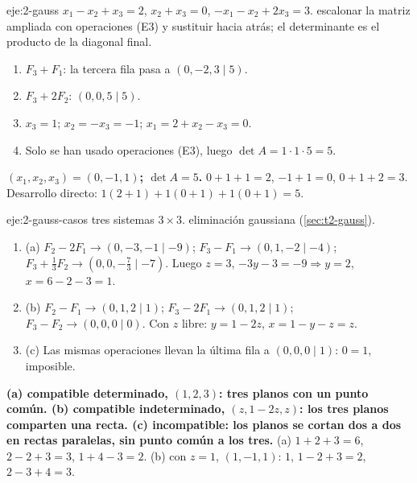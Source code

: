 \begin{solucion}{eje:2-gauss}
\datos $x_1-x_2+x_3=2$, $x_2+x_3=0$, $-x_1-x_2+2x_3=3$.
\planteamiento escalonar la matriz ampliada con operaciones (E3) y sustituir hacia atrás; el determinante es el producto de la diagonal final.
\pasos
\begin{enumerate}[label=\arabic*.]
  \item $F_3+F_1$: la tercera fila pasa a $(0,-2,3\mid5)$.
  \item $F_3+2F_2$: $(0,0,5\mid5)$.
  \item $x_3=1$; $x_2=-x_3=-1$; $x_1=2+x_2-x_3=0$.
  \item Solo se han usado operaciones (E3), luego $\det A=1\cdot1\cdot5=5$.
\end{enumerate}
\resultado \textbf{$(x_1,x_2,x_3)=(0,-1,1)$; $\det A=5$.}
\comprobacion $0+1+1=2$, $-1+1=0$, $0+1+2=3$. Desarrollo directo: $1(2+1)+1(0+1)+1(0+1)=5$.
\end{solucion}

\begin{solucion}{eje:2-gauss-casos}
\datos tres sistemas $3\times3$.
\planteamiento eliminación gaussiana (\cref{sec:t2-gauss}).
\pasos
\begin{enumerate}[label=\arabic*.]
  \item (a) $F_2-2F_1\to(0,-3,-1\mid-9)$; $F_3-F_1\to(0,1,-2\mid-4)$; $F_3+\frac13F_2\to(0,0,-\frac73\mid-7)$. Luego $z=3$, $-3y-3=-9\Rightarrow y=2$, $x=6-2-3=1$.
  \item (b) $F_2-F_1\to(0,1,2\mid1)$; $F_3-2F_1\to(0,1,2\mid1)$; $F_3-F_2\to(0,0,0\mid0)$. Con $z$ libre: $y=1-2z$, $x=1-y-z=z$.
  \item (c) Las mismas operaciones llevan la última fila a $(0,0,0\mid1)$: $0=1$, imposible.
\end{enumerate}
\resultado \textbf{(a) compatible determinado, $(1,2,3)$: tres planos con un punto común. (b) compatible indeterminado, $(z,1-2z,z)$: los tres planos comparten una recta. (c) incompatible: los planos se cortan dos a dos en rectas paralelas, sin punto común a los tres.}
\comprobacion (a) $1+2+3=6$, $2-2+3=3$, $1+4-3=2$. (b) con $z=1$, $(1,-1,1)$: $1$, $1-2+3=2$, $2-3+4=3$.
\end{solucion}

